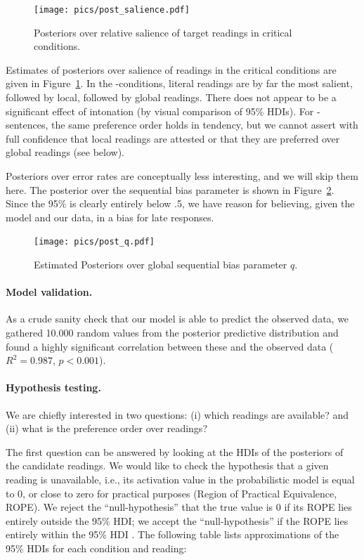 \documentclass[fleqn,reqno,10pt,draft]{article}
\newcommand{\as}{\acro{as}}
\renewcommand{\es}{\acro{es}}
\begin{document}
\begin{figure}
  \centering
  \texttt{[image: pics/post\_salience.pdf]}
  \caption{Posteriors over relative salience of target readings in
    critical conditions.}
  \label{fig:Posterior_T}
\end{figure}

Estimates of posteriors over salience of readings in the critical
conditions are given in Figure~\ref{fig:Posterior_T}. In the
\es-conditions, literal readings are by far the most salient, followed
by local, followed by global readings. There does not appear to be a
significant effect of intonation (by visual comparison of 95\%
HDIs). For \as-sentences, the same preference order holds in tendency,
but we cannot assert with full confidence that local readings are
attested or that they are preferred over global readings (see below).
 
Posteriors over error rates are conceptually less interesting, and we
will skip them here. The posterior over the sequential bias parameter
is shown in Figure~\ref{fig:post_q}. Since the 95\% is clearly
entirely below .5, we have reason for believing, given the model and
our data, in a bias for late responses.

\begin{figure}
  \centering
  \texttt{[image: pics/post\_q.pdf]}
  \caption{Estimated Posteriors over global sequential bias parameter
    $q$.}
  \label{fig:post_q}
\end{figure}

\paragraph{Model validation.} As a crude sanity check that our model
is able to predict the observed data, we gathered 10.000 random values
from the posterior predictive distribution and found a highly
significant correlation between these and the observed data ($R^2 =
0.987$, $p < 0.001$).

\paragraph{Hypothesis testing.} We are chiefly interested in two
questions: (i) which readings are available? and (ii) what is the
preference order over readings?

The first question can be answered by looking at the HDIs of the
posteriors of the candidate readings. We would like to check the
hypothesis that a given reading is unavailable, i.e., its activation
value in the probabilistic model is equal to 0, or close to zero for
practical purposes (Region of Practical Equivalence, ROPE). We reject
the ``null-hypothesis'' that the true value is 0 if its ROPE lies
entirely outside the 95\% HDI; we accept the ``null-hypothesis'' if
the ROPE lies entirely within the 95\% HDI
\citep[][Ch.~12]{Kruschke2011:Doing-Bayesian-}. The following table
lists approximations of the 95\% HDIs for each condition and reading:
\end{document}
